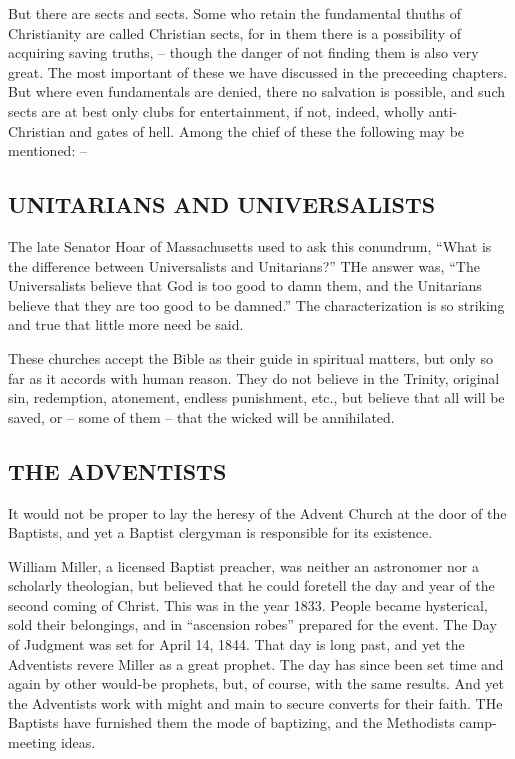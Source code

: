 \documentclass[
]{book}
\begin{document}
But there are sects and sects. Some who retain the fundamental thuths of Christianity are called Christian sects, for in them there is a possibility of acquiring saving truths, -- though the danger of not finding them is also very great. The most important of these we have discussed in the preceeding chapters. But where even fundamentals are denied, there no salvation is possible, and such sects are at best only clubs for entertainment, if not, indeed, wholly anti-Christian and gates of hell. Among the chief of these the following may be mentioned: --

\hypertarget{unitarians-and-universalists}{%
\subsection{UNITARIANS AND UNIVERSALISTS}\label{unitarians-and-universalists}}

The late Senator Hoar of Massachusetts used to ask this conundrum, ``What is the difference between Universalists and Unitarians?'' THe answer was, ``The Universalists believe that God is too good to damn them, and the Unitarians believe that they are too good to be damned.'' The characterization is so striking and true that little more need be said.

These churches accept the Bible as their guide in spiritual matters, but only so far as it accords with human reason. They do not believe in the Trinity, original sin, redemption, atonement, endless punishment, etc., but believe that all will be saved, or -- some of them -- that the wicked will be annihilated.

\hypertarget{the-adventists}{%
\subsection{THE ADVENTISTS}\label{the-adventists}}

It would not be proper to lay the heresy of the Advent Church at the door of the Baptists, and yet a Baptist clergyman is responsible for its existence.

William Miller, a licensed Baptist preacher, was neither an astronomer nor a scholarly theologian, but believed that he could foretell the day and year of the second coming of Christ. This was in the year 1833. People became hysterical, sold their belongings, and in ``ascension robes'' prepared for the event. The Day of Judgment was set for April 14, 1844. That day is long past, and yet the Adventists revere Miller as a great prophet. The day has since been set time and again by other would-be prophets, but, of course, with the same results. And yet the Adventists work with might and main to secure converts for their faith. THe Baptists have furnished them the mode of baptizing, and the Methodists camp-meeting ideas.
\end{document}
